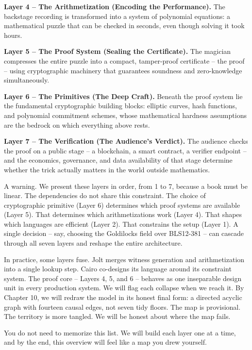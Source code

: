 \documentclass[
  11pt,
  openany]{report}
\renewcommand{\textbf}[1]{{\bfseries\color{MidnightBold}#1}}
\begin{document}
\textbf{Layer 4 -- The Arithmetization (Encoding the Performance).} The
backstage recording is transformed into a system of polynomial equations: a
mathematical puzzle that can be checked in seconds, even though solving it took
hours.

\textbf{Layer 5 -- The Proof System (Sealing the Certificate).} The magician
compresses the entire puzzle into a compact, tamper-proof certificate -- the
proof -- using cryptographic machinery that guarantees soundness and
zero-knowledge simultaneously.

\textbf{Layer 6 -- The Primitives (The Deep Craft).} Beneath the proof system
lie the fundamental cryptographic building blocks: elliptic curves, hash
functions, and polynomial commitment schemes, whose mathematical hardness
assumptions are the bedrock on which everything above rests.

\textbf{Layer 7 -- The Verification (The Audience's Verdict).} The audience
checks the proof on a public stage -- a blockchain, a smart contract, a verifier
endpoint -- and the economics, governance, and data availability of that stage
determine whether the trick actually matters in the world outside mathematics.

A warning. We present these layers in order, from 1 to 7, because a book must be
linear. The dependencies do not share this constraint. The choice of
cryptographic primitive (Layer 6) determines which proof systems are available
(Layer 5). That determines which arithmetizations work (Layer 4). That shapes
which languages are efficient (Layer 2). That constrains the setup (Layer 1). A
single decision -- say, choosing the Goldilocks field over BLS12-381 -- can
cascade through all seven layers and reshape the entire architecture.

In practice, some layers fuse. Jolt merges witness generation and
arithmetization into a single lookup step. Cairo co-designs its language around
its constraint system. The proof core -- Layers 4, 5, and 6 -- behaves as one
inseparable design unit in every production system. We will flag each collapse
when we reach it. By Chapter 10, we will redraw the model in its honest final
form: a directed acyclic graph with fourteen causal edges, not seven tidy
floors. The map is provisional. The territory is more tangled. We will be honest
about where the map fails.

You do not need to memorize this list. We will build each layer one at a time,
and by the end, this overview will feel like a map you drew yourself.
\end{document}
